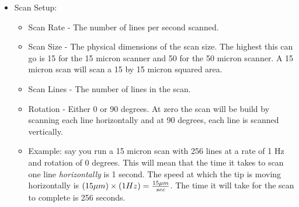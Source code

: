 \documentclass{../lab}
\begin{document}
\begin{itemize}
    \item \textbf{​​}Scan Setup:​

    \begin{itemize}
        \item Scan Rate - The number of lines per second scanned.

        \item Scan Size - The physical dimensions of the scan size. The highest this can go is 15 for the 15 micron scanner and 50 for the 50 micron scanner. A 15 micron scan will scan a 15 by 15 micron squared area.

        \item Scan Lines - The number of lines in the scan.

        \item Rotation - Either 0 or 90 degrees. At zero the scan will be build by scanning each line horizontally and at 90 degrees, each line is scanned vertically.

        \item Example: say you run a 15 micron scan with 256 lines at a rate of 1 Hz and rotation of 0 degrees. This will mean that the time it takes to scan one line \emph{horizontally} is 1 second. The speed at which the tip is moving horizontally is $(15 \mu m)\times(1Hz) = {15 \mu m \over sec}$.  The time it will take for the scan to complete is 256 seconds.

    \end{itemize}

\end{itemize}

​
\end{document}
